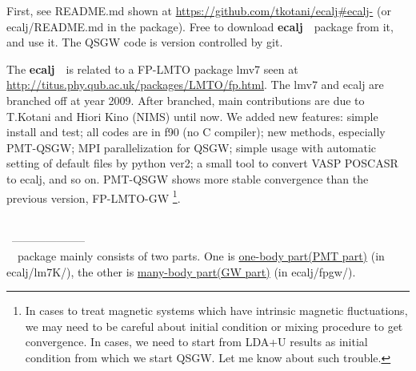 \documentclass[a4paper,10pt,epsf,fleqn]{article}
\newcommand{\io}[1]{{\sf  #1}}
\newcommand{\ecalj}{{\bf ecalj}\ }
\begin{document}
First, see README.md shown at 
\url{https://github.com/tkotani/ecalj#ecalj-} 
(or ecalj/README.md in the package).
Free to download \ecalj\ package from it, and use it.
The QSGW code is version controlled by git. 


The \ecalj\ is related to a FP-LMTO package lmv7 seen at\\
\url{http://titus.phy.qub.ac.uk/packages/LMTO/fp.html}. 
The lmv7 and ecalj are branched off at year 2009.
After branched, main contributions are 
due to T.Kotani and Hiori Kino (NIMS) until now. 
We added new features: simple install and test;
all codes are in f90 (no C compiler);
new methods, especially PMT-QSGW; MPI parallelization for QSGW;
simple usage with automatic setting of default files by python ver2;
a small tool to convert VASP POSCASR to ecalj, and so on.
PMT-QSGW shows more stable convergence than the previous version, FP-LMTO-GW
\footnote{In cases to treat magnetic
systems which have intrinsic magnetic fluctuations, 
we may need to be careful about initial condition or mixing procedure
to get convergence. In cases, we need to start from LDA+U results as initial
condition from which we start QSGW. Let me know about such trouble.}.

\ \\

\ -------------------- \\
\noindent \ecalj\ package mainly consists of two parts.
One is \underline{one-body part(PMT part)} (in \io{ecalj/lm7K/}), 
the other is \underline{many-body part(GW part)} (in \io{ecalj/fpgw/}).\\
\end{document}
